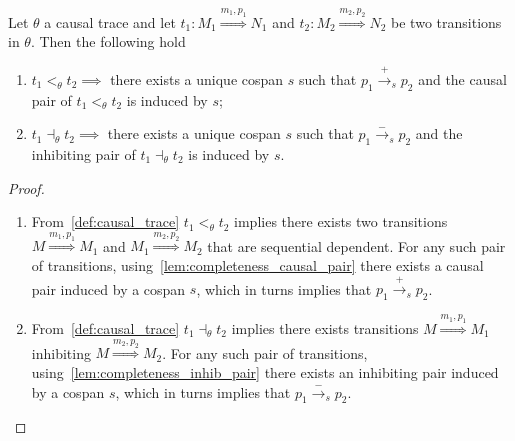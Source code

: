 \begin{lemma}
  \label{lemma:pos_infl}
  Let $\theta$ a causal trace and let $t_1:M_1\overset{m_1,p_1}{\Rightarrow}N_1$ and $t_2:M_2\overset{m_2,p_2}{\Rightarrow}N_2$ be two transitions in $\theta$. Then the following hold
  \begin{enumerate}
  \item $t_1 <_{\theta} t_2\implies$ there exists a unique cospan $s$ such that $p_1\xrightarrow{+}_s p_2$ and the causal pair of $t_1 <_{\theta} t_2$ is induced by $s$;
  \item $t_1\dashv_{\theta} t_2\implies$ there exists a unique cospan $s$ such that $p_1\xrightarrow{-}_s p_2$ and the inhibiting pair of $t_1\dashv_{\theta} t_2$ is induced by $s$.
  \end{enumerate}
\end{lemma}
\begin{proof}
  \begin{enumerate}
  \item From~\autoref{def:causal_trace} $t_1 <_{\theta} t_2$ implies there exists two transitions $M\overset{m_1,p_1}{\Rightarrow} M_1$ and $M_1\overset{m_2,p_2}{\Rightarrow} M_2$ that are sequential dependent. For any such pair of transitions, using~\autoref{lem:completeness_causal_pair} there exists a causal pair induced by a cospan $s$, which in turns implies that $p_1\xrightarrow{+}_{s}p_2$.

  \item From~\autoref{def:causal_trace} $t_1 \dashv_{\theta} t_2$ implies there exists transitions $M\overset{m_1,p_1}{\Rightarrow} M_1$ inhibiting $M\overset{m_2,p_2}{\Rightarrow} M_2$. For any such pair of transitions, using~\autoref{lem:completeness_inhib_pair} there exists an inhibiting pair induced by a cospan $s$, which in turns implies that $p_1\xrightarrow{-}_s p_2$.
  \end{enumerate}
\end{proof}

